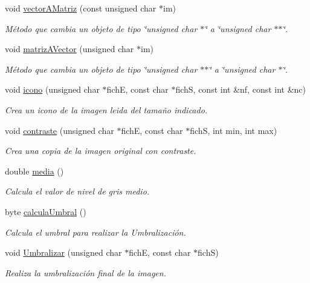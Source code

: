 \begin{DoxyCompactItemize}
void \hyperlink{classImagen_a9474788797224ae8011aa346acedc6c1}{vector\+A\+Matriz} (const unsigned char $\ast$im)
\begin{DoxyCompactList}\small\item\em Método que cambia un objeto de tipo \char`\"{}unsigned char $\ast$\char`\"{} a \char`\"{}unsigned char $\ast$$\ast$\char`\"{}. \end{DoxyCompactList}\item 
void \hyperlink{classImagen_a2c9361edc4ffbd541c8073f900a0195d}{matriz\+A\+Vector} (unsigned char $\ast$im)
\begin{DoxyCompactList}\small\item\em Método que cambia un objeto de tipo \char`\"{}unsigned char $\ast$$\ast$\char`\"{} a \char`\"{}unsigned char $\ast$\char`\"{}. \end{DoxyCompactList}\item 
void \hyperlink{classImagen_a907ddfbd42c70ad280ed1384b2e97781}{icono} (unsigned char $\ast$fichE, const char $\ast$fichS, const int \&nf, const int \&nc)
\begin{DoxyCompactList}\small\item\em Crea un icono de la imagen leida del tamaño indicado. \end{DoxyCompactList}\item 
void \hyperlink{classImagen_a8962df1329aabab547f9b5ed808446b0}{contraste} (unsigned char $\ast$fichE, const char $\ast$fichS, int min, int max)
\begin{DoxyCompactList}\small\item\em Crea una copia de la imagen original con contraste. \end{DoxyCompactList}\item 
double \hyperlink{classImagen_a6e645bb64264a8e029673d364ae1f838}{media} ()
\begin{DoxyCompactList}\small\item\em Calcula el valor de nivel de gris medio. \end{DoxyCompactList}\item 
byte \hyperlink{classImagen_ac8f79b53d192da91e502b221f3972f6c}{calcula\+Umbral} ()
\begin{DoxyCompactList}\small\item\em Calcula el umbral para realizar la Umbralización. \end{DoxyCompactList}\item 
void \hyperlink{classImagen_a5ec143dabc92d00ef71f1831ae15b66a}{Umbralizar} (unsigned char $\ast$fichE, const char $\ast$fichS)
\begin{DoxyCompactList}\small\item\em Realiza la umbralización final de la imagen. \end{DoxyCompactList}\end{DoxyCompactItemize}


